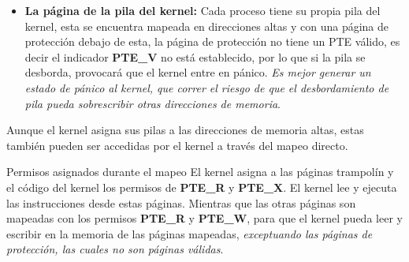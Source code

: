\documentclass{libs/ufc_format}
\begin{document}
\begin{frame}{}
    \begin{itemize}
        \item \textbf{La página de la pila del kernel:} Cada proceso tiene su propia pila del kernel, esta se encuentra mapeada en direcciones altas y con una página de protección debajo de esta, la página de protección no tiene un PTE válido, es decir el indicador \textbf{PTE\_V} no está establecido, por lo que si la pila se desborda, provocará que el kernel entre en pánico. \emph{Es mejor generar un estado de pánico al kernel, que correr el riesgo de que el desbordamiento de pila pueda sobrescribir otras direcciones de memoria}. \cite{xv6_book}
    \end{itemize}

    \vspace{0.2cm}

    Aunque el kernel asigna sus pilas a las direcciones de memoria altas, estas también pueden ser accedidas por el kernel a través del mapeo directo.
\end{frame}
\begin{frame}{Permisos asignados durante el mapeo}
    El kernel asigna a las páginas trampolín y el código del kernel los permisos de \textbf{PTE\_R} y\textbf{ PTE\_X}. El kernel lee y ejecuta las instrucciones desde estas páginas. Mientras que las otras páginas son mapeadas con los permisos \textbf{PTE\_R} y \textbf{PTE\_W}, para que el kernel pueda leer y escribir en la memoria de las páginas mapeadas, \emph{exceptuando las páginas de protección, las cuales no son páginas válidas}. \cite{xv6_book}
\end{frame}
\end{document}
